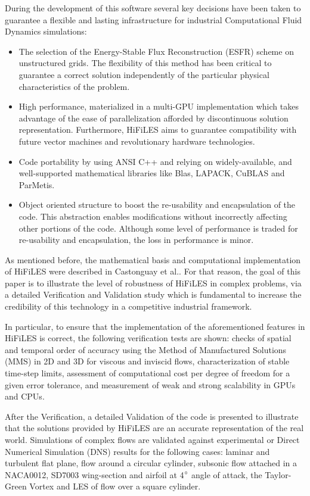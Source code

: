 During the development of this software several key decisions have been taken to guarantee a flexible and lasting infrastructure for industrial Computational Fluid Dynamics simulations:
\begin{itemize}
\item The selection of the Energy-Stable Flux Reconstruction (ESFR) scheme on unstructured grids. The flexibility of this method has been critical to guarantee a correct solution independently of the particular physical characteristics of the problem.
\item High performance, materialized in a multi-GPU implementation which takes advantage of the ease of parallelization afforded by discontinuous solution representation. Furthermore, HiFiLES aims to guarantee compatibility with future vector machines and revolutionary hardware technologies.
\item Code portability by using ANSI C++ and relying on widely-available, and well-supported mathematical libraries like Blas, LAPACK, CuBLAS and ParMetis.
\item Object oriented structure to boost the re-usability and encapsulation of the code. This abstraction enables modifications without incorrectly affecting other portions of the code. Although some level of performance is traded for re-usability and encapsulation, the loss in performance is minor.
\end{itemize}

As mentioned before, the mathematical basis and computational implementation of HiFiLES were described in Castonguay et al.\cite{castonguay2011}. For that reason, the goal of this paper is to illustrate the level of robustness of HiFiLES in complex problems, via a detailed Verification and Validation study which is fundamental to increase the credibility of this technology in a competitive industrial framework.

In particular, to ensure that the implementation of the aforementioned features in HiFiLES is correct, the following verification tests are shown: checks of spatial and temporal order of accuracy using the Method of Manufactured Solutions (MMS) in 2D and 3D for viscous and inviscid flows, characterization of stable time-step limits, assessment of computational cost per degree of freedom for a given error tolerance, and measurement of weak and strong scalability in GPUs and CPUs. 

After the Verification, a detailed Validation of the code is presented to illustrate that the solutions provided by HiFiLES are an accurate representation of the real world. Simulations of complex flows are validated against experimental or Direct Numerical Simulation (DNS) results for the following cases: laminar and turbulent flat plane, flow around a circular cylinder, subsonic flow attached in a NACA0012, SD7003 wing-section and airfoil at 4$^{\circ}$ angle of attack, the Taylor-Green Vortex and LES of flow over a square cylinder.

